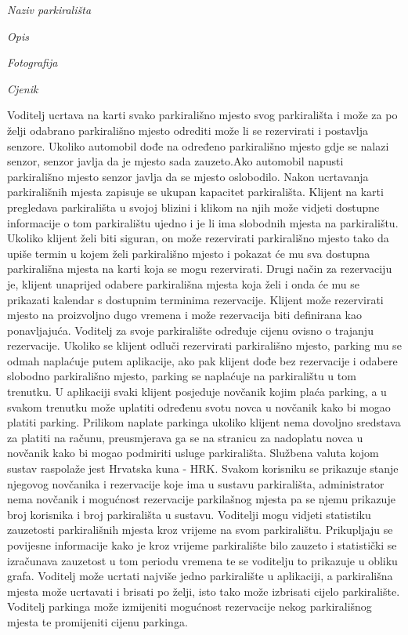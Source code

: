                 \begin{packed_item}
			\item \textit{Naziv parkirališta }
			\item \textit{Opis }
			\item \textit{Fotografija}
                        \item \textit{Cjenik}
		\end{packed_item}

Voditelj ucrtava na karti svako parkirališno mjesto svog parkirališta i može za po želji odabrano parkirališno mjesto odrediti može li se rezervirati i postavlja senzore. Ukoliko automobil dođe na određeno parkirališno mjesto gdje se nalazi senzor, senzor javlja da je mjesto sada zauzeto.Ako automobil napusti parkirališno mjesto senzor javlja da se mjesto oslobodilo. Nakon ucrtavanja parkirališnih mjesta zapisuje se ukupan kapacitet parkirališta.
Klijent na karti pregledava parkirališta u svojoj blizini i klikom na njih može vidjeti dostupne informacije o tom parkiralištu ujedno i je li ima slobodnih mjesta na parkiralištu. Ukoliko klijent želi biti siguran, on može rezervirati parkirališno mjesto tako da upiše termin u kojem želi parkirališno mjesto i pokazat će mu sva dostupna parkirališna mjesta na karti koja se mogu rezervirati. Drugi način za rezervaciju je, klijent unaprijed odabere parkirališna mjesta koja želi i onda će mu se prikazati kalendar s dostupnim terminima rezervacije. Klijent može rezervirati mjesto na proizvoljno dugo vremena i može rezervacija biti definirana kao ponavljajuća. Voditelj za svoje parkiralište određuje cijenu ovisno o trajanju rezervacije. Ukoliko se klijent odluči rezervirati parkirališno mjesto, parking mu se odmah naplaćuje putem aplikacije, ako pak klijent dođe bez rezervacije i odabere slobodno parkirališno mjesto, parking se naplaćuje na parkiralištu u tom trenutku. U aplikaciji svaki klijent posjeduje novčanik kojim plaća parking, a u svakom trenutku može uplatiti određenu svotu novca u novčanik kako bi mogao platiti parking. Prilikom naplate parkinga ukoliko klijent nema dovoljno sredstava za platiti na računu, preusmjerava ga se na stranicu za nadoplatu novca u novčanik kako bi mogao podmiriti usluge parkirališta. Službena valuta kojom sustav raspolaže jest Hrvatska kuna - HRK. Svakom korisniku se prikazuje stanje njegovog novčanika i rezervacije koje ima u sustavu parkirališta, administrator nema novčanik i mogućnost rezervacije parkilašnog mjesta pa se njemu prikazuje broj korisnika i broj parkirališta u sustavu.
Voditelji mogu vidjeti statistiku zauzetosti parkirališnih mjesta kroz vrijeme na svom parkiralištu. Prikupljaju se povijesne informacije kako je kroz vrijeme parkiralište bilo zauzeto i statistički se izračunava zauzetost u tom periodu vremena te se voditelju to prikazuje u obliku grafa. Voditelj može ucrtati najviše jedno parkiralište u aplikaciji, a parkirališna mjesta može ucrtavati i brisati po želji, isto tako može izbrisati cijelo parkiralište. Voditelj parkinga može izmijeniti mogućnost rezervacije nekog parkirališnog mjesta te promijeniti cijenu parkinga. 

